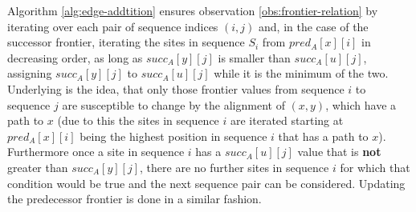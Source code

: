  Algorithm \ref{alg:edge-addtition} ensures observation \ref{obs:frontier-relation} by iterating over each pair of sequence indices $(i,j)$ and, in the case of the successor frontier, iterating the sites in sequence $S_i$ from $pred_A[x][i]$ in decreasing order, as long as $succ_A[y][j]$ is smaller than $succ_A[u][j]$, assigning $succ_A[y][j]$ to $succ_A[u][j]$ while it is the minimum of the two. Underlying is the idea, that only those frontier values from sequence $i$ to sequence $j$ are susceptible to change by the alignment of $(x, y)$, which have a path to $x$ (due to this the sites in sequence $i$ are iterated starting at $pred_A[x][i]$ being the highest position in sequence $i$ that has a path to $x$). Furthermore once a site in sequence $i$ has a $succ_A[u][j]$ value that is \textbf{not} greater than $succ_A[y][j]$, there are no further sites in sequence $i$ for which that condition would be true and the next sequence pair can be considered.
 Updating the predecessor frontier is done in a similar fashion.\\
 
 
 \begin{algorithm}[h]
 	\DontPrintSemicolon
 	
 	 {
 		
 	}
 	
 	 {
 		
 	}
 	
 	\caption{EdgeAddition(x, y) as proposed by Abdedda{\"\i}m \cite{abdeddaim1997incremental}}
 	\label{alg:edge-addtition}
 \end{algorithm}
 
